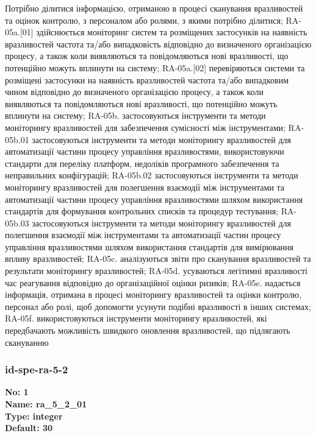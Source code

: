 \documentclass{article}
\begin{document}
{\footnotesize Потрібно ділитися інформацією, отриманою в процесі сканування вразливостей та оцінок контролю, з персоналом або ролями, з якими потрібно ділитися; RA-05a.[01] здійснюється моніторинг систем та розміщених застосунків на наявність вразливостей частота та/або випадковість відповідно до визначеного організацією процесу, а також коли виявляються та повідомляються нові вразливості, що потенційно можуть вплинути на систему; RA-05a.[02] перевіряються системи та розміщені застосунки на наявність вразливостей частота та/або випадковим чином відповідно до визначеного організацією процесу, а також коли виявляються та повідомляються нові вразливості, що потенційно можуть вплинути на систему; RA-05b. застосовуються інструменти та методи моніторингу вразливостей для забезпечення сумісності між інструментами; RA-05b.01 застосовуються інструменти та методи моніторингу вразливостей для автоматизації частини процесу управління вразливостями, використовуючи стандарти для переліку платформ, недоліків програмного забезпечення та неправильних конфігурацій; RA-05b.02 застосовуються інструменти та методи моніторингу вразливостей для полегшення взаємодії між інструментами та автоматизації частини процесу управління вразливостями шляхом використання стандартів для формування контрольних списків та процедур тестування; RA-05b.03 застосовуються інструменти та методи моніторингу вразливостей для полегшення взаємодії між інструментами та автоматизації частин процесу управління вразливостями шляхом використання стандартів для вимірювання впливу вразливостей; RA-05c. аналізуються звіти про сканування вразливостей та результати моніторингу вразливостей; RA-05d. усуваються легітимні вразливості час реагування відповідно до організаційної оцінки ризиків; RA-05e. надається інформація, отримана в процесі моніторингу вразливостей та оцінки контролю, персонал або ролі, щоб допомогти усунути подібні вразливості в інших системах; RA-05f. використовуються інструменти моніторингу вразливостей, які передбачають можливість швидкого оновлення вразливостей, що підлягають скануванню}




\subsubsection{id-spe-ra-5-2}


\vspace{10pt}
{\footnotesize\bfseries
No: 1\\
Name: ra\_\allowbreak{}5\_\allowbreak{}2\_\allowbreak{}01\\
Type: integer\\
Default: 30
}
\end{document}
